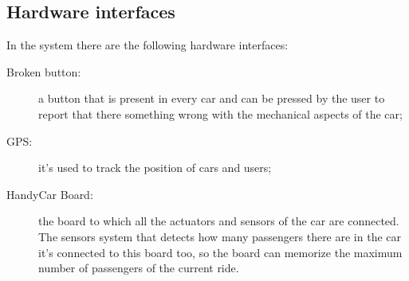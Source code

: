 \subsection{Hardware interfaces}
In the system there are the following hardware interfaces:
\begin{description}
	\item [Broken button:] a button that is present in every car and can be pressed by the user to report that there something wrong with the mechanical aspects of the car;
	\item [GPS:] it's used to track the position of cars and users;
	\item [HandyCar Board:] the board to which all the actuators and sensors of the car are connected. The sensors system that detects how many passengers there are in the car it's connected to this board too, so the board can memorize the maximum number of passengers of the current ride.
\end{description}

